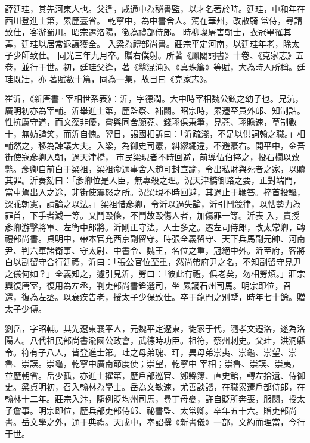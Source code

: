 
\begin{pinyinscope}
薛廷珪，其先河東人也。父逢，咸通中為秘書監，以才名著於時。廷珪，中和年在西川登進士第，累歷臺省。
 乾寧中，為中書舍人。駕在華州，改散騎
 常侍，尋請致仕，客游蜀川。昭宗遷洛陽，徵為禮部侍郎。
 時柳璨屠害朝士，衣冠畢罹其毒，廷珪以居常退讓獲全。
 入梁為禮部尚書。莊宗平定河南，以廷珪年老，除太子少師致仕。
 同光三年九月卒。贈右僕射。所著《鳳閣詞書》十卷、《克家志》五卷，並行于世。初，廷珪父逢，著《鑿混沌》、《真珠簾》等賦，大為時人所稱。廷珪既壯，亦
 著賦數十篇，同為一集，故目曰《克家志》。



 崔沂，《新唐書·宰相世系表》：沂，字德潤。大中時宰相魏公鉉之幼子也。兄沆，廣明初亦為宰輔。沂舉進士第，歷監察、補闕。昭宗時，累遷至員外郎、知制誥。性抗厲守道，而文藻非優，嘗與同舍顏蕘、錢珝俱秉筆，見蕘、珝贍速，草制數十，無妨譚笑，而沂自愧。翌日，謁國相訴曰：「沂疏淺，不足以供詞翰之職。」相輔然之，移為諫議大夫。入梁，為御史司憲，糾繆繩違，不避豪右。開平中，金吾街使寇彥卿入朝，過天津橋，
 市民梁現者不時回避，前導伍伯捽之，投石欄以致斃。彥卿自前白于梁祖，梁祖命通事舍人趙可封宣諭，令出私財與死者之家，以贖其罪。沂奏劾曰：「彥卿位是人臣，無專殺之理。況天津橋御路之要，正對端門，當車駕出入之途，非街使震怒之所。況梁現不時回避，其過止于鞭笞。捽首投驅，深乖朝憲，請論之以法。」梁祖惜彥卿，令沂以過失論，沂引鬥競律，以怙勢力為罪首，下手者減一等。又鬥毆條，不鬥故毆傷人者，加傷罪一等。沂表
 入，責授彥卿游擊將軍、左衛中郎將。沂剛正守法，人士多之。遷左司侍郎，改太常卿，轉禮部尚書。貞明中，帶本官充西京副留守。時張全義留守、天下兵馬副元帥、河南尹、判六軍諸衛事、守太尉、中書令、魏王，名位之重，冠絕中外。沂至府，客將白以副留守合行廷禮，沂曰：「張公官位至重，然尚帶府尹之名，不知副留守見尹之儀何如？」全義知之，遽引見沂，勞曰：「彼此有禮，俱老矣，勿相勞煩。」莊宗興復唐室，復用為左丞，判吏部尚書銓選司，坐
 累謫石州司馬。明宗即位，召還，復為左丞。以衰疾告老，授太子少保致仕。卒于龍門之別墅，時年七十餘。贈太子少傅。



 劉岳，字昭輔。其先遼東襄平人，元魏平定遼東，徙家于代，隨孝文遷洛，遂為洛陽人。八代祖民部尚書渝國公政會，武德時功臣。祖符，蔡州刺史。父珪，洪洞縣令。符有子八人，皆登進士第。珪之母弟瑰、玕，異母弟崇夷、崇龜、崇望、崇魯、崇謨。崇龜，乾寧中廣南節度使；崇望，乾寧中
 宰相；崇魯、崇謨、崇夷，並歷朝省。岳少孤，亦進士擢第，歷戶部巡官、鄭縣簿、直史館，轉左拾遺、侍御史。梁貞明初，召入翰林為學士。岳為文敏速，尤善談諧，在職累遷戶部侍郎，在翰林十二年。莊宗入汴，隨例貶均州司馬，尋丁母憂，許自貶所奔喪，服闋，授太子詹事。明宗即位，歷兵部吏部侍郎、祕書監、太常卿。卒年五十六。贈吏部尚書。岳文學之外，通于典禮。天成中，奉詔撰《新書儀》一部，文約而理當，今行于世。




\end{pinyinscope}
